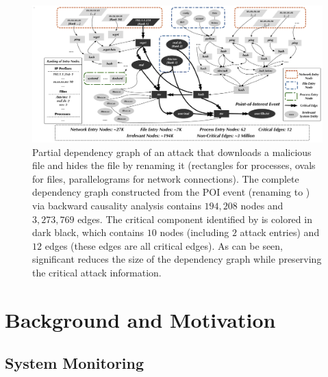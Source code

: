 

\begin{figure}[!t]
    \centering
    \includegraphics[width=\textwidth, keepaspectratio]{figs/s&p/overview.pdf}
    \caption{Partial dependency graph of an attack that downloads a malicious file and hides the file by renaming it (rectangles for processes, ovals for files, parallelograms for network connections).
    The complete dependency graph constructed from the POI event (renaming to ) via backward causality analysis contains $194,208$ nodes and $3,273,769$ edges.
    The critical component identified by \tool is colored in dark black, which contains $10$ nodes (including $2$ attack entries) and $12$ edges (these edges are all critical edges).
    As can be seen, \tool significant reduces the size of the dependency graph while preserving the critical attack information.
    }

    \label{fig:motivate}
\end{figure}


\section{Background and Motivation}

\subsection{System Monitoring}
\label{subsec:system-monitoring}

